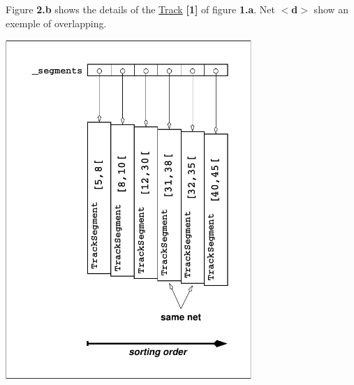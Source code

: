 Figure {\bfseries 2.\+b} shows the details of the \mbox{\hyperlink{classKite_1_1Track}{Track}} {\bfseries \mbox{[}1\mbox{]}} of figure {\bfseries 1.\+a}. Net {\bfseries $<$d$>$} show an exemple of overlapping.

 
\begin{DoxyImage}
\includegraphics[width=0.7\textwidth]{Track-1}
\end{DoxyImage}


